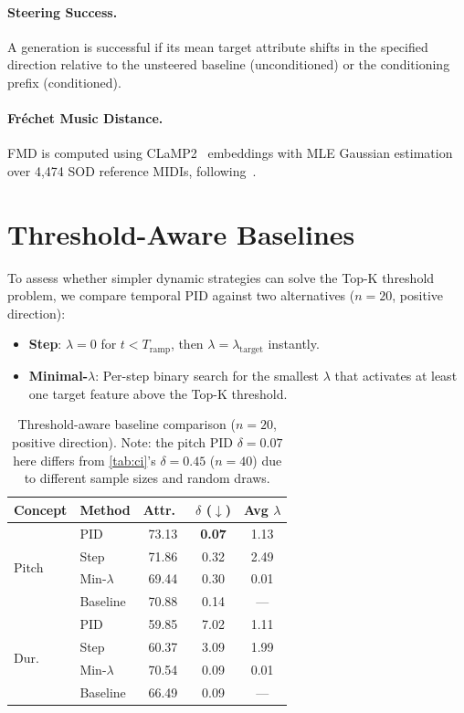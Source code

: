 \documentclass{article}
\theoremstyle{plain}
\begin{document}
\paragraph{Steering Success.}
A generation is successful if its mean target attribute shifts in the specified direction relative to the unsteered baseline (unconditioned) or the conditioning prefix (conditioned).

\paragraph{Fr\'{e}chet Music Distance.}
FMD is computed using CLaMP2~\cite{wu2024clamp2} embeddings with MLE Gaussian estimation over 4,474 SOD reference MIDIs, following~\citet{wu2024fmd}.

\section{Threshold-Aware Baselines}
\label{app:threshold_baselines}

To assess whether simpler dynamic strategies can solve the Top-K threshold problem, we compare temporal PID against two alternatives ($n{=}20$, positive direction):

\begin{itemize}
    \item \textbf{Step}: $\lambda{=}0$ for $t < T_\text{ramp}$, then $\lambda{=}\lambda_\text{target}$ instantly.
    \item \textbf{Minimal-$\lambda$}: Per-step binary search for the smallest $\lambda$ that activates at least one target feature above the Top-K threshold.
\end{itemize}

\begin{table}[h]
  \caption{Threshold-aware baseline comparison ($n{=}20$, positive direction). Note: the pitch PID $\delta{=}0.07$ here differs from \cref{tab:ci}'s $\delta{=}0.45$ ($n{=}40$) due to different sample sizes and random draws.}
  \label{tab:threshold}
  \begin{center}
  \begin{small}
  \begin{tabular}{llccc}
    \toprule
    Concept & Method & Attr.\ & $\delta$ ($\downarrow$) & Avg $\lambda$ \\
    \midrule
    \multirow{4}{*}{Pitch} & PID & 73.13 & \textbf{0.07} & 1.13 \\
    & Step & 71.86 & 0.32 & 2.49 \\
    & Min-$\lambda$ & 69.44 & 0.30 & 0.01 \\
    & Baseline & 70.88 & 0.14 & --- \\
    \midrule
    \multirow{4}{*}{Dur.} & PID & 59.85 & 7.02 & 1.11 \\
    & Step & 60.37 & 3.09 & 1.99 \\
    & Min-$\lambda$ & 70.54 & 0.09 & 0.01 \\
    & Baseline & 66.49 & 0.09 & --- \\
    \bottomrule
  \end{tabular}
  \end{small}
  \end{center}
\end{table}
\end{document}
